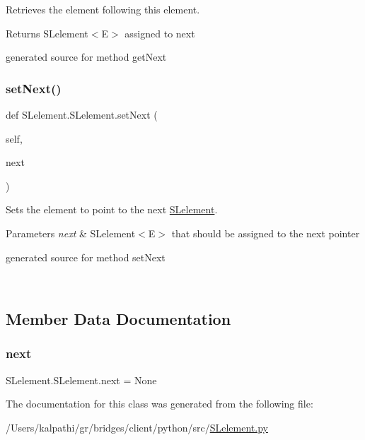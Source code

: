 Retrieves the element following this element. 

\begin{DoxyReturn}{Returns}
S\+Lelement$<$\+E$>$ assigned to next\begin{DoxyVerb}generated source for method getNext \end{DoxyVerb}
 
\end{DoxyReturn}
\hypertarget{class_s_lelement_1_1_s_lelement_a7afcfe543e4e652c9f28a3d97c8b04bf}{}\label{class_s_lelement_1_1_s_lelement_a7afcfe543e4e652c9f28a3d97c8b04bf} 
\subsubsection{\texorpdfstring{set\+Next()}{setNext()}}
{\footnotesize\ttfamily def S\+Lelement.\+S\+Lelement.\+set\+Next (\begin{DoxyParamCaption}\item[{}]{self,  }\item[{}]{next }\end{DoxyParamCaption})}



Sets the element to point to the next \hyperlink{class_s_lelement_1_1_s_lelement}{S\+Lelement}. 


\begin{DoxyParams}{Parameters}
{\em next} & S\+Lelement$<$\+E$>$ that should be assigned to the next pointer\begin{DoxyVerb}generated source for method setNext \end{DoxyVerb}
 \\
\hline
\end{DoxyParams}


\subsection{Member Data Documentation}
\hypertarget{class_s_lelement_1_1_s_lelement_a2d83afedba3b70183c90c3454ac99a29}{}\label{class_s_lelement_1_1_s_lelement_a2d83afedba3b70183c90c3454ac99a29} 
\subsubsection{\texorpdfstring{next}{next}}
{\footnotesize\ttfamily S\+Lelement.\+S\+Lelement.\+next = None\hspace{0.3cm}{\ttfamily [static]}}



The documentation for this class was generated from the following file\+:\begin{DoxyCompactItemize}
\item 
/\+Users/kalpathi/gr/bridges/client/python/src/\hyperlink{_s_lelement_8py}{S\+Lelement.\+py}\end{DoxyCompactItemize}
